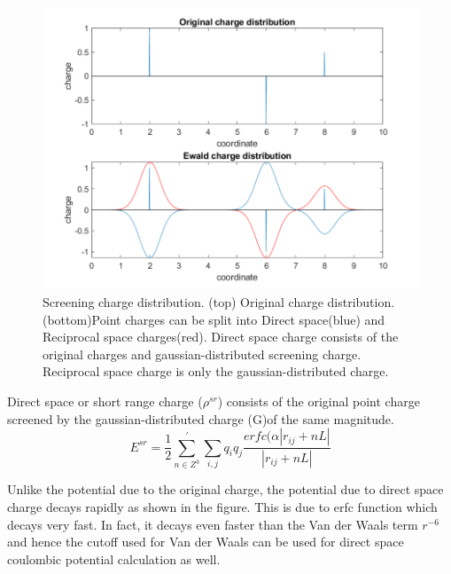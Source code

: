 \documentclass[9pt,bestpractices]{livecoms}
\begin{document}
\begin{figure}[h]
\centering
\includegraphics[width=\linewidth]{ewald.pdf}
    \caption{Screening charge distribution. (top) Original charge distribution. (bottom)Point charges can be split into Direct space(blue) and Reciprocal space charges(red). Direct space charge consists of the original charges and gaussian-distributed screening charge. Reciprocal space charge is only the gaussian-distributed charge. }
\label{charges_ewald}
\end{figure}

Direct space or short range charge ($\rho^{sr}$) consists of the original point charge screened by the gaussian-distributed charge (G)of the same magnitude. 
\[
E^{sr} = \frac{1}{2} \sum_{n \in Z^3}^{'} \sum_{i,j}q_i q_j \frac{erfc(\alpha|r_{ij} + nL|}{|r_{ij} + nL|}
\]

Unlike the potential due to the original charge, the potential due to direct space charge decays rapidly as shown in the figure. This is due to erfc function which decays very fast. In fact, it decays even faster than the Van der Waals term $r^{-6}$ and hence the cutoff used for Van der Waals can be used for direct space coulombic potential calculation as well.
\end{document}
